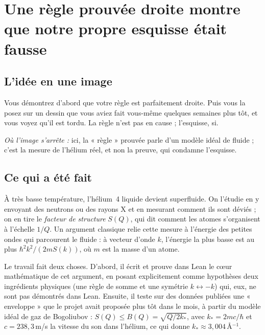 \chapter[Une règle droite, une esquisse fausse]{Une règle prouvée droite montre que notre propre esquisse était fausse}

\section*{L'idée en une image}

\begin{analogie}
Vous démontrez d'abord que votre règle est parfaitement droite. Puis vous la posez sur un dessin que vous aviez fait
vous-même quelques semaines plus tôt, et vous voyez qu'il est tordu. La règle n'est pas en cause ; l'esquisse, si.

\emph{Où l'image s'arrête :} ici, la « règle » prouvée parle d'un modèle idéal de fluide ; c'est la mesure de
l'hélium réel, et non la preuve, qui condamne l'esquisse.
\end{analogie}

\section*{Ce qui a été fait}

À très basse température, l'hélium~4 liquide devient superfluide.
On l'étudie en y envoyant des neutrons ou des rayons X et en mesurant comment ils sont déviés ; on en tire le
\emph{facteur de structure} $S(Q)$, qui dit comment les atomes s'organisent à l'échelle $1/Q$. Un argument classique
relie cette mesure à l'énergie des petites ondes qui parcourent le fluide : à vecteur d'onde $k$, l'énergie la plus
basse est au plus $\hbar^2k^2/(2mS(k))$, où $m$ est la masse d'un atome.

Le travail fait deux choses. D'abord, il écrit et prouve dans Lean le cœur mathématique de cet argument, en posant
explicitement comme hypothèses deux ingrédients physiques (une règle de somme et une symétrie $k\leftrightarrow-k$)
qui, eux, ne sont pas démontrés dans Lean. Ensuite, il teste sur des données publiées une « enveloppe » que le projet
avait proposée plus tôt dans le mois, à partir du modèle idéal de gaz de Bogoliubov : $S(Q)\le B(Q)=\sqrt{Q/2k_*}$,
avec $k_*=2mc/\hbar$ et $c=238{,}3$\,m/s la vitesse du son dans l'hélium, ce qui donne $k_*\approx3{,}004$\,Å$^{-1}$.

